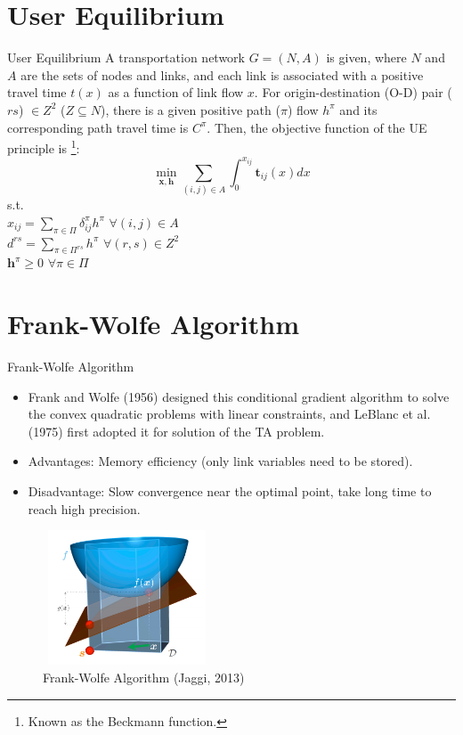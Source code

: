 \documentclass{beamer}
\newcommand{\vect}[1]{\boldsymbol{#1}}
\begin{document}
	\section{User Equilibrium}
		\begin{frame}{User Equilibrium}
		A transportation network $G = (N, A)$ is given, where $N$ and $A$ are the sets of nodes and links, and each link  is associated
		with a positive travel time $t(x)$ as a function of link flow $x$.  For origin-destination (O-D) pair ($rs$) $\in Z^2$ ($Z \subseteq N$), there is a given positive path ($\pi$) flow $h^\pi$ and its corresponding path travel time is $C^\pi$. Then, the objective function of the UE principle is \footnote{Known as the Beckmann function.}:
		$$ \min_{\vect{x},\vect{h}} \sum_{(i,j) \in A}^{} \int_{0}^{x_{ij}} \vect{t}_{ij}(x)dx$$ 
		s.t. \\
		
		\hfill $ x_{ij}=\sum_{\pi \in \Pi} \delta_{ij}^\pi h^\pi$  \hspace{2cm}  $\forall (i,j) \in A$  \\
		\hfill $ d^{rs}=\sum_{\pi \in \Pi^{rs}} h^\pi$ \hspace{2.1cm}  $\forall (r,s) \in Z^2$ \\
		\hfill $ \vect{h}^\pi \geq 0$ \hspace{3.7cm}  $\forall \pi \in \Pi$ \\

		\end{frame} 

\section{Frank-Wolfe Algorithm}
\begin{frame}{Frank-Wolfe Algorithm}
	\begin{itemize}

\item Frank and Wolfe (1956) designed this conditional gradient algorithm to solve the convex quadratic problems with linear constraints, and LeBlanc et al. (1975) first adopted it for solution of the TA problem.
\item Advantages: Memory efficiency (only link variables need to be stored).
\item Disadvantage: Slow convergence near the optimal point, take long time to reach high precision.
	\end{itemize}
\begin{figure}
	\includegraphics[width=5cm, height=4cm]{Fig/FrankWolfe.png}
	\caption{Frank-Wolfe Algorithm (Jaggi, 2013)}
\end{figure}
\end{frame}
\end{document}

